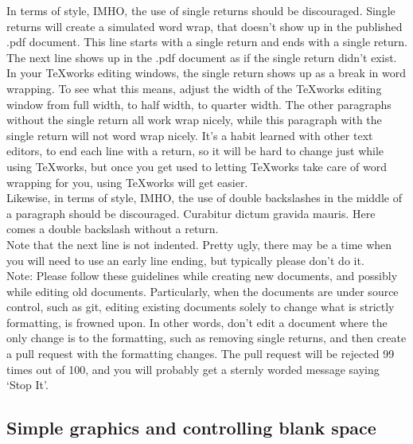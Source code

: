 In terms of style, IMHO, the use of single returns should be discouraged.  Single returns will create a simulated word wrap, that doesn't show up in the published .pdf document.
This line starts with a single return and ends with a single return.
The next line shows up in the .pdf document as if the single return didn't exist.  In your TeXworks editing windows, the single return shows up as a break in word wrapping.  To see what this means, adjust the width of the TeXworks editing window from full width, to half width, to quarter width.  The other paragraphs without the single return all work wrap nicely, while this paragraph with the single return will not word wrap nicely.  It's a habit learned with other text editors, to end each line with a return, so it will be hard to change just while using TeXworks, but once you get used to letting TeXworks take care of word wrapping for you, using TeXworks will get easier.\\

Likewise, in terms of style, IMHO, the use of double backslashes in the middle of a paragraph should be discouraged. Curabitur dictum gravida mauris.  Here comes a double backslash without a return.\\ Note that the next line is not indented.  Pretty ugly, there may be a time when you will need to use an early line ending, but typically please don't do it.\\

Note:  Please follow these guidelines while creating new documents, and possibly while editing old documents.  Particularly, when the documents are under source control, such as git, editing existing documents solely to change what is strictly formatting, is frowned upon.  In other words, don't edit a document where the only change is to the formatting, such as removing single returns, and then create a pull request with the formatting changes.  The pull request will be rejected 99 times out of 100, and you will probably get a sternly worded message saying `Stop It'.

\newpage

\subsection*{Simple graphics and controlling blank space}

